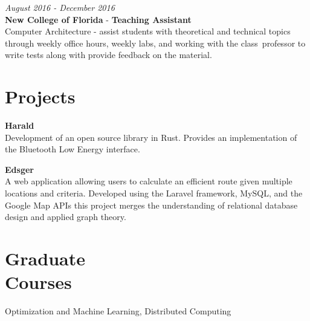 \documentclass[margin,line,a4paper]{resume}
\begin{document}
\begin{resume}
        \textit{August 2016 - December 2016}\\
        \textbf{New College of Florida} - \textbf{Teaching Assistant}\\
        Computer Architecture -  assist students with theoretical and technical topics through weekly office hours, weekly labs, and working with the class\textquotesingle \, professor to write tests along with provide feedback on the material.
    
    \section{\mysidestyle Projects}
        \textbf{Harald}\\
        Development of an open source library in Rust. Provides an implementation of the Bluetooth Low Energy interface.
        
        \textbf{Edsger}\\
        A web application allowing users to                              calculate an efficient route given
        multiple locations and criteria. Developed
        using the Laravel framework, MySQL, and the Google Map APIs this project merges the understanding of relational database design and applied graph theory.
        
    \section{\mysidestyle Graduate\\Courses}
        Optimization and Machine Learning, Distributed Computing

\end{resume}
\end{document}
